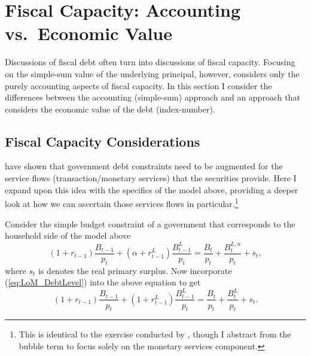\documentclass[11pt,a4paper,margin=1.5in]{article}
\begin{document}





\section{Fiscal Capacity: Accounting vs.\ Economic Value}
Discussions of fiscal debt often turn into discussions of fiscal capacity.
Focusing on the simple-sum value of the underlying principal, however, considers only the purely accounting aspects of fiscal capacity.
In this section I consider the differences between the accounting (simple-sum) approach and an approach that considers the economic value of the debt (index-number).

\subsection{Fiscal Capacity Considerations}
\label{subsec:Theory_Capacity}
\citet*{Brunnermeier-Merkel-Sannikov:2022} have shown that government debt constraints need to be augmented for the service flows (transaction/monetary services) that the securities provide.
Here I expand upon this idea with the specifics of the model above, providing a deeper look at how we can ascertain those services flows in particular.\footnote{
	This is identical to the exercise conducted by \citet{Brunnermeier-Merkel-Sannikov:2020}, though I abstract from the bubble term to focus solely on the monetary services component.}

	Consider the simple budget constraint of a government that corresponds to the household side of the model above
\begin{equation*}
	(1+r_{t-1})\frac{B_{t-1}}{p_t} + (\alpha + r^L_{t-1})\frac{B^L_{t-1}}{p_t} = \frac{B_t}{p_t} + \frac{B^{L,n}_t}{p_t} + s_t,
\end{equation*}
where $s_t$ is denotes the real primary surplus. 
Now incorporate (\ref{eq:LoM_DebtLevel}) into the above equation to get
\begin{equation}
	(1+r_{t-1})\frac{B_{t-1}}{p_t} + (1 + r^L_{t-1})\frac{B^L_{t-1}}{p_t} = \frac{B_t}{p_t} + \frac{B^{L}_t}{p_t} + s_t.
	\label{eq:Gov_PeriodBudget}
\end{equation}
\end{document}

